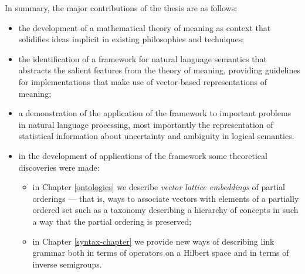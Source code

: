 In summary, the major contributions of the thesis are as follows:
\begin{itemize}
\item the development of a mathematical theory of meaning as context that solidifies ideas implicit in existing philosophies and techniques;
\item the identification of a framework for natural language semantics that abstracts the salient features from the theory of meaning, providing guidelines for implementations that make use of vector-based representations of meaning;
\item a demonstration of the application of the framework to important problems in natural language processing, most importantly the representation of statistical information about uncertainty and ambiguity in logical semantics.
\item in the development of applications of the framework some theoretical discoveries were made:
\begin{itemize}
\item in Chapter \ref{ontologies} we describe \emph{vector lattice embeddings} of partial orderings --- that is, ways to associate vectors with elements of a partially ordered set such as a taxonomy describing a hierarchy of concepts in such a way that the partial ordering is preserved;
\item in Chapter \ref{syntax-chapter} we provide new ways of describing link grammar both in terms of operators on a Hilbert space and in terms of inverse semigroups.
\end{itemize}
\end{itemize}




